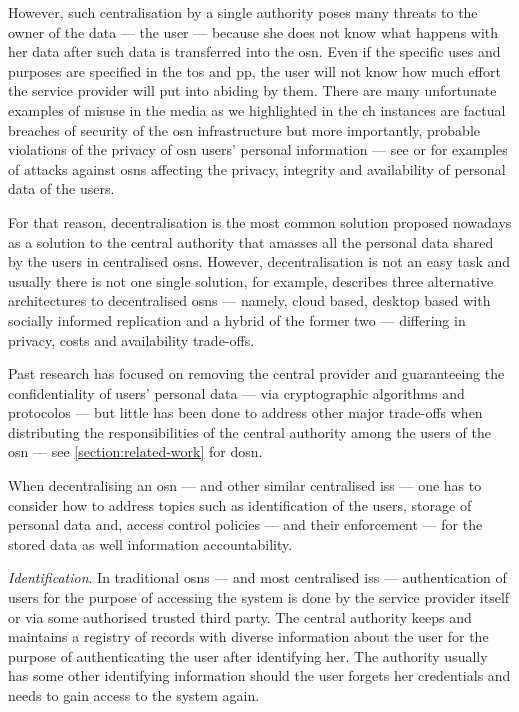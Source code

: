 \documentclass[showtrims,oldfontcommands]{kthesis}
\makeatletter
\newcommand\firstToLow[1]{%
 {%
   \renewcommand{\mfirstucMakeUppercase}{\MakeLowercase}%
   \makefirstuc{#1}%
 }%
}
\newcommand*{\lcnameref}[1]{%
 \begingroup 
   \let\label\@gobble
   \NR@setref{#1}\lc@thirdoffive{#1}%
  \endgroup
}
\newcommand{\lc@thirdoffive}[5]{\firstToLow{#3}}
\makeatother
\begin{document}
However, such centralisation by a single authority poses many threats to the owner 
of the data --- the user --- because she does not know what happens with her data 
after such data is transferred into the \ac{osn}. Even if the specific uses and 
purposes are specified in the \ac{tos} and \ac{pp}, the user will not know how much 
effort the service provider will put into abiding by them. There are many unfortunate 
examples of misuse in the media as we highlighted in the \lcnameref{chapter:introduction}.
Such instances are factual breaches of security of the \ac{osn} infrastructure but 
more importantly, probable violations of the privacy of \ac{osn} users' personal 
information --- see \cite{CutilloMS10} or \cite{GaoHHWC11} for examples of attacks 
against \acp{osn} affecting the privacy, integrity and availability of personal 
data of the users.

For that reason, decentralisation is the most common solution proposed nowadays 
as a solution to the central authority that amasses all the personal data shared 
by the users in centralised \acp{osn}. However, decentralisation is not an easy 
task and usually there is not one single solution, for example, \cite{ShakimovVCC09} 
describes three alternative architectures to decentralised \acp{osn} --- namely, 
cloud based, desktop based with socially informed replication and a hybrid of the 
former two --- differing in privacy, costs and availability trade-offs. 

Past research has focused on removing the central provider and guaranteeing the 
confidentiality of users' personal data --- via cryptographic algorithms and protocolos 
--- but little has been done to address other major trade-offs when distributing 
the responsibilities of the central authority among the users of the \ac{osn} \cite{GreschbachKB12} 
--- see \cref{section:related-work} for \lcnameref{section:related-work} on \acp{dosn}.

When decentralising an \ac{osn} --- and other similar centralised \acp{is} --- one 
has to consider how to address topics such as identification of the users, storage 
of personal data and, access control policies --- and their enforcement --- for 
the stored data as well information accountability.

\textit{Identification}. In traditional \acp{osn} --- and most centralised \acp{is} 
--- authentication of users for the purpose of accessing the system is done by the 
service provider itself or via some authorised trusted third party. The central 
authority keeps and maintains a registry of records with diverse information about 
the user for the purpose of authenticating the user after identifying her. The authority 
usually has some other identifying information should the user forgets her credentials 
and needs to gain access to the system again.
\end{document}
